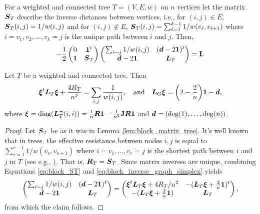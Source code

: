 \begin{lemma}
	\label{lem:block_matrix_tree}
 For a weighted and connected tree $T=(V,E,w)$ on $n$ vertices let the matrix $\vb*{S}_T$ describe the inverse distances  between vertices, i.e., for $(i,j)\in E$, $\vb*{S}_T(i,j) = 1/w(i,j)$ and for $(i,j)\notin E$, $\vb*{S}_T(i,j) = \sum_{\ell=1}^{k-1} 1/w(v_\ell,v_{\ell+1})$ where $i=v_1,v_2,\dots,v_k=j$ is the unique path between $i$ and $j$. Then,
 \begin{equation}
 \label{eq:block_ST}
-\frac{1}{2} \begin{pmatrix}
0 & \vb{1}^t \\
\vb{1} & \vb*{S}_T 
\end{pmatrix}
\begin{pmatrix}
\sum_{i\sim j}1/w(i,j)  & (\vb*{d}-2\vb{1})^t \\
\vb*{d}-2\vb{1} & \vb*{L}_T
\end{pmatrix} = \vb{I}.
 \end{equation}
\end{lemma}

\begin{corollary}
	Let $T$  be a weighted and connected tree. Then 
	\begin{equation*}
	\vb*{\xi}^t \vb*{L}_T\vb*{\xi} + \frac{4R_T}{n^2} = \sum_{i,j}  \frac{1}{w(i,j)}, \quad \text{and}\quad \vb*{L}_G\vb*{\xi} = \bigg(2-\frac{2}{n}\bigg)\vb{1} - \vb*{d},
	\end{equation*}
	where $\vb*{\xi} = \text{diag}(\vb*{L}_T^+(i,i))=\frac{1}{n}\vb*{R}\vb{1} - \frac{1}{n^2} \vb{J} \vb*{R}\vb{1}$ and $\vb*{d}= (\deg(1),\dots,\deg(n))$. 
\end{corollary}
\begin{proof}
	Let $\vb*{S}_T$ be as it was in  Lemma \ref{lem:block_matrix_tree}. It's well known  that in trees, the effective resistance between nodes $i,j$  is equal to $\sum_{s=1}^{r-1} 1/w(v_s,v_{s+1})$ where $i=v_1,\dots,v_r=j$ is the shortest path between $i$ and $j$ in $T$ (see e.g., \cite{ellens2011effective}). That is, $\vb*{R}_T=\vb*{S}_T$. Since matrix inverses are unique, combining Equations \eqref{eq:block_ST} and \eqref{eq:block_inverse_graph_simplex} yields 
	\begin{equation*}
	\begin{pmatrix}
	\sum_{i\sim j}1/w(i,j)  & (\vb*{d}-2\vb{1})^t \\
	\vb*{d}-2\vb{1} & \vb*{L}_T
	\end{pmatrix} = \begin{pmatrix}
\vb*{\xi}^t  \vb*{L}_T \vb*{\xi}  + 4R_T/n^2
	&  -(\vb*{L}_T\vb*{\xi} + \frac{2}{n}\vb{1} )^t \\
	-(\vb*{L}_T\vb*{\xi} + \frac{2}{n}\vb{1} ) 
	& \vb*{L}_T
	\end{pmatrix},
	\end{equation*}  
	from which the claim follows. 
\end{proof}






